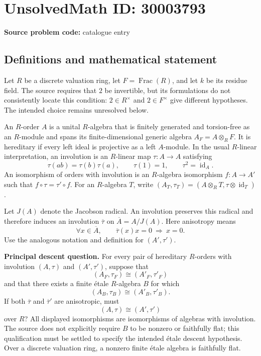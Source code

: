 \documentclass[11pt]{article}
\begin{document}
\section*{UnsolvedMath ID: 30003793}
\textbf{Source problem code:} catalogue entry
\subsection{Definitions and mathematical statement}
Let \(R\) be a discrete valuation ring, let \(F=\operatorname{Frac}(R)\), and let \(k\) be its residue field. The source requires that \(2\) be invertible, but its formulations do not consistently locate this condition: \(2\in R^\times\) and \(2\in F^\times\) give different hypotheses. The intended choice remains unresolved below.

An \(R\)-order \(A\) is a unital \(R\)-algebra that is finitely generated and torsion-free as an \(R\)-module and spans its finite-dimensional generic algebra \(A_F=A\otimes_R F\). It is hereditary if every left ideal is projective as a left \(A\)-module. In the usual \(R\)-linear interpretation, an involution is an \(R\)-linear map \(\tau:A\to A\) satisfying
\[
\tau(ab)=\tau(b)\tau(a),\qquad \tau(1)=1,\qquad \tau^2=\operatorname{id}_A.
\]
An isomorphism of orders with involution is an \(R\)-algebra isomorphism \(f:A\to A'\) such that \(f\circ\tau=\tau'\circ f\). For an \(R\)-algebra \(T\), write \((A_T,\tau_T)=(A\otimes_R T,\tau\otimes\operatorname{id}_T)\).

Let \(J(A)\) denote the Jacobson radical. An involution preserves this radical and therefore induces an involution \(\overline\tau\) on \(\overline A=A/J(A)\). Here anisotropy means
\[
\forall x\in\overline A,\qquad \overline\tau(x)x=0\ \Longrightarrow\ x=0.
\]
Use the analogous notation and definition for \((A',\tau')\).

\textbf{Principal descent question.} For every pair of hereditary \(R\)-orders with involution \((A,\tau)\) and \((A',\tau')\), suppose that
\[
(A_F,\tau_F)\cong(A'_F,\tau'_F)
\]
and that there exists a finite \'{e}tale \(R\)-algebra \(B\) for which
\[
(A_B,\tau_B)\cong(A'_B,\tau'_B).
\]
If both \(\overline\tau\) and \(\overline\tau'\) are anisotropic, must
\[
(A,\tau)\cong(A',\tau')
\]
over \(R\)? All displayed isomorphisms are isomorphisms of algebras with involution. The source does not explicitly require \(B\) to be nonzero or faithfully flat; this qualification must be settled to specify the intended \'{e}tale descent hypothesis. Over a discrete valuation ring, a nonzero finite \'{e}tale algebra is faithfully flat.
\end{document}
